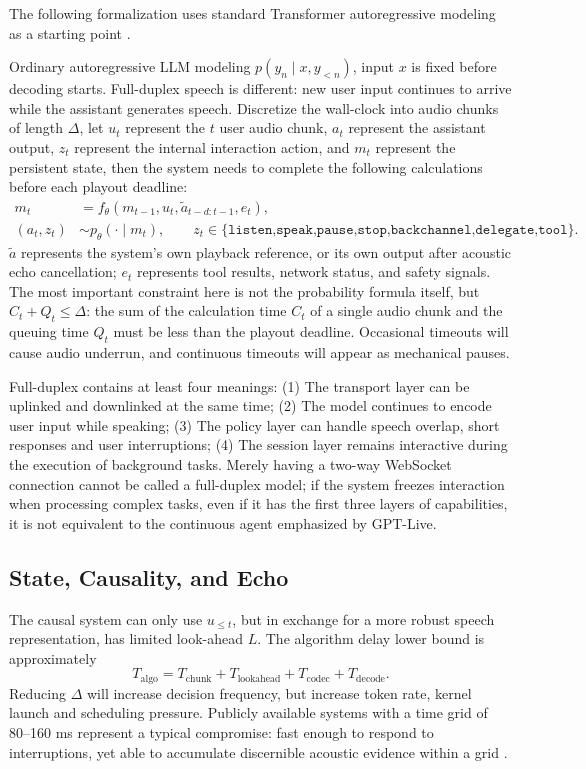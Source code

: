 \documentclass[UTF8,fontset=none,a4paper,10pt]{ctexart}
\begin{document}
The following formalization uses standard Transformer autoregressive modeling as a starting point \cite{en:vaswani2017attention}.

Ordinary autoregressive LLM modeling $p(y_n\mid x,y_{<n})$, input $x$ is fixed before decoding starts. Full-duplex speech is different: new user input continues to arrive while the assistant generates speech. Discretize the wall-clock into audio chunks of length $\Delta$, let $u_t$ represent the $t$ user audio chunk, $a_t$ represent the assistant output, $z_t$ represent the internal interaction action, and $m_t$ represent the persistent state, then the system needs to complete the following calculations before each playout deadline:
\begin{align}
m_t &= f_\theta(m_{t-1},u_t,\tilde a_{t-d:t-1},e_t),\\
(a_t,z_t) &\sim p_\theta(\cdot\mid m_t),\qquad
z_t\in\{\texttt{listen,speak,pause,stop,backchannel,delegate,tool}\}.
\end{align}
$\tilde a$ represents the system's own playback reference, or its own output after acoustic echo cancellation; $e_t$ represents tool results, network status, and safety signals. The most important constraint here is not the probability formula itself, but $C_t+Q_t\leq\Delta$: the sum of the calculation time $C_t$ of a single audio chunk and the queuing time $Q_t$ must be less than the playout deadline. Occasional timeouts will cause audio underrun, and continuous timeouts will appear as mechanical pauses.

Full-duplex contains at least four meanings: (1) The transport layer can be uplinked and downlinked at the same time; (2) The model continues to encode user input while speaking; (3) The policy layer can handle speech overlap, short responses and user interruptions; (4) The session layer remains interactive during the execution of background tasks. Merely having a two-way WebSocket connection cannot be called a full-duplex model; if the system freezes interaction when processing complex tasks, even if it has the first three layers of capabilities, it is not equivalent to the continuous agent emphasized by GPT-Live.

\subsection{State, Causality, and Echo}

The causal system can only use $u_{\le t}$, but in exchange for a more robust speech representation, has limited look-ahead $L$. The algorithm delay lower bound is approximately
\begin{equation}
T_{\mathrm{algo}}=T_{\mathrm{chunk}}+T_{\mathrm{lookahead}}+T_{\mathrm{codec}}+T_{\mathrm{decode}}.
\end{equation}
Reducing $\Delta$ will increase decision frequency, but increase token rate, kernel launch and scheduling pressure. Publicly available systems with a time grid of 80--160 ms represent a typical compromise: fast enough to respond to interruptions, yet able to accumulate discernible acoustic evidence within a grid \cite{en:defossez2024moshi,en:zhang2026duplexsla}.
\end{document}
